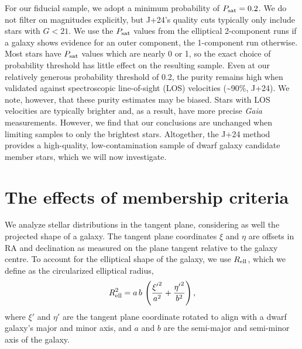 For our fiducial sample, we adopt a minimum probability of
\(P_{\rm sat} = 0.2\). We do not filter on magnitudes explicitly, but
J+24's quality cuts typically only include stars with \(G < 21\). We use
the \(P_{\rm sat}\) values from the elliptical 2-component runs if a
galaxy shows evidence for an outer component, the 1-component run
otherwise. Most stars have \(P_{\rm  sat}\) values which are nearly 0 or
1, so the exact choice of probability threshold has little effect on the
resulting sample. Even at our relatively generous probability threshold
of 0.2, the purity remains high when validated against spectroscopic
line-of-sight (LOS) velocities (\textasciitilde90\%, J+24). We note,
however, that these purity estimates may be biased. Stars with LOS
velocities are typically brighter and, as a result, have more precise
\emph{Gaia} measurements. However, we find that our conclusions are
unchanged when limiting samples to only the brightest stars. Altogether,
the J+24 method provides a high-quality, low-contamination sample of
dwarf galaxy candidate member stars, which we will now investigate.

\section{The effects of membership
criteria}\label{the-effects-of-membership-criteria}

We analyze stellar distributions in the tangent plane, considering as
well the projected shape of a galaxy. The tangent plane coordinates
\(\xi\) and \(\eta\) are offsets in RA and declination as measured on
the plane tangent relative to the galaxy centre. To account for the
elliptical shape of the galaxy, we use \(R_{\rm ell}\), which we define
as the circularized elliptical radius, \begin{equation}{
R_{\rm ell}^2 = a\,b\,\left(\frac{{\xi'}^2}{a^2} + \frac{{\eta'}^2}{b^2} \right),
}\end{equation} where \(\xi'\) and \(\eta'\) are the tangent plane
coordinate rotated to align with a dwarf galaxy's major and minor axis,
and \(a\) and \(b\) are the semi-major and semi-minor axis of the
galaxy.

